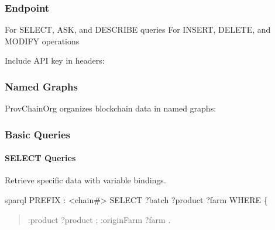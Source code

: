 \documentclass[letterpaper,10pt,english]{sphinxmanual}
\begin{document}
\subsubsection{Endpoint}
\label{\detokenize{api/sparql-api:endpoint}}
\sphinxAtStartPar
{} 

\sphinxAtStartPar
{}
\sphinxhyphen{}  \sphinxhyphen{} For SELECT, ASK, and DESCRIBE queries
\sphinxhyphen{}  \sphinxhyphen{} For INSERT, DELETE, and MODIFY operations

\sphinxAtStartPar
{}
Include API key in headers:


\subsubsection{Named Graphs}
\label{\detokenize{api/sparql-api:named-graphs}}
\sphinxAtStartPar
ProvChainOrg organizes blockchain data in named graphs:

\sphinxAtStartPar
{}


\subsubsection{Basic Queries}
\label{\detokenize{api/sparql-api:basic-queries}}

\paragraph{SELECT Queries}
\label{\detokenize{api/sparql-api:select-queries}}
\sphinxAtStartPar
Retrieve specific data with variable bindings.

\sphinxAtStartPar
{}
{\color{red}\bfseries{}\textasciigrave{}\textasciigrave{}}{\color{red}\bfseries{}\textasciigrave{}}sparql
PREFIX : \textless{}\sphinxhyphen{}chain\#\textgreater{}
SELECT ?batch ?product ?farm WHERE \{
\begin{quote}
\begin{description}
\sphinxAtStartPar
:product ?product ;
:originFarm ?farm .

\end{description}
\end{quote}
\end{document}
